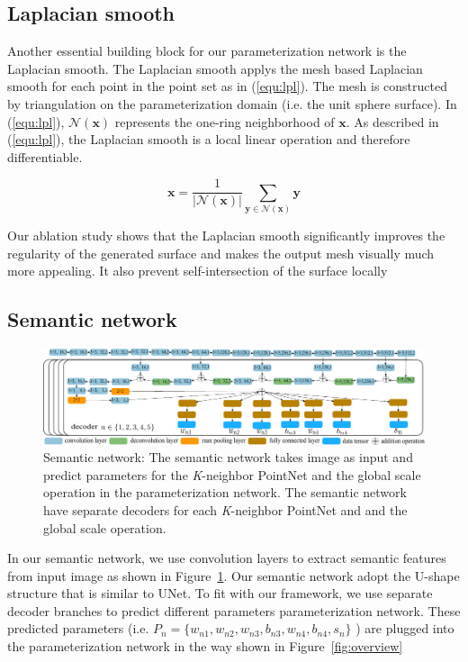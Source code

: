 \subsection{Laplacian smooth}
Another essential building block for our parameterization network is the Laplacian smooth. The Laplacian smooth applys the mesh based Laplacian smooth for each point in the point set as in (\ref{equ:lpl}). The mesh is constructed by triangulation on the parameterization domain (i.e. the unit sphere surface). In (\ref{equ:lpl}), $\mathcal{N}(\mathbf{x})$ represents the one-ring neighborhood of $\mathbf{x}$. As described in (\ref{equ:lpl}), the Laplacian smooth is a local linear operation and therefore differentiable.

\begin{equation}
\mathbf{x} = \frac{1}{|\mathcal{N}(\mathbf{x})|}\sum_{\mathbf{y}\in\mathcal{N}(\mathbf{x})}\mathbf{y}
\label{equ:lpl}
\end{equation}

Our ablation study shows that the Laplacian smooth significantly improves the regularity of the generated surface and makes the output mesh visually much more appealing. It also prevent self-intersection of the surface locally
\subsection{Semantic network}
\label{subsec:semnet}

\begin{figure}[htbp]
	\centering
	\includegraphics[width=\linewidth]{img/net/semnet}
	\caption{Semantic network: The semantic network takes image as input and predict parameters for the \textit{K}-neighbor PointNet and the global scale operation in the parameterization network. The semantic network have separate decoders for each \textit{K}-neighbor PointNet and and the global scale operation.}
	\label{fig:semnet}
\end{figure}

In our semantic network, we use convolution layers to extract semantic features from input image as shown in Figure~\ref{fig:semnet}.  Our semantic network adopt the U-shape structure that is similar to UNet\cite{unet}. To fit with our framework, we use separate decoder branches to predict different parameters parameterization network. These predicted parameters (i.e. $P_n=\{w_{n1},w_{n2},w_{n3},b_{n3},w_{n4},b_{n4},s_{n}\}$ ) are plugged into the parameterization network in the way shown in Figure~\ref{fig:overview}

